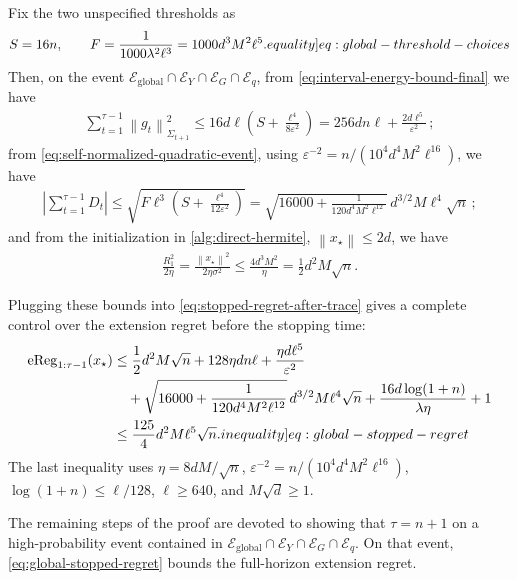 \documentclass[12pt,cleveref]{jmlr}
\newcommand{\eqlabel}[1]{\label[equality]{#1}}
\newcommand{\ineqlabel}[1]{\label[inequality]{#1}}
\newcommand{\1}{\mathbf 1}
\newcommand{\eps}{\varepsilon}
\newcommand{\norm}[1]{\left\lVert #1\right\rVert}
\newcommand{\normm}[2]{\left\lVert #1\right\rVert_{#2}}
\begin{document}
Fix the two unspecified thresholds as
\begin{align}
    S=16n,
    \qquad
    F=\frac{1}{1000\lambda^2\ell^3}
    =1000d^3M^2\ell^5.
    \eqlabel{eq:global-threshold-choices}
\end{align}
Then, on the event
$\mathcal E_{\mathrm{global}}\cap\mathcal E_Y\cap\mathcal E_G\cap\mathcal E_q$,
from \cref{eq:interval-energy-bound-final} we have
\begin{align}
    \sum_{t=1}^{\tau-1} \normm{g_t}{\Sigma_{t+1}}^2
    \leq
    16d\ell\left(S+\frac{\ell^4}{8\eps^2}\right)
    =256dn\ell+\frac{2d\ell^5}{\eps^2}\,;
\end{align}
from \cref{eq:self-normalized-quadratic-event}, using
$\eps^{-2}=n/(10^4d^4M^2\ell^{16})$, we have
\begin{align}
    \left|\sum_{t=1}^{\tau-1}D_t\right|
    \leq\sqrt{F\ell^3\left(S+\frac{\ell^4}{12\eps^2}\right)}
    =\sqrt{16000+\frac{1}{120d^4M^2\ell^{12}}}\,d^{3/2}M\ell^4\sqrt n\,;
\end{align}
and from the initialization in \cref{alg:direct-hermite},
$\norm{x_\star}\leq2d$, we have
\begin{align}
    \frac{R_1^2}{2\eta}
    =\frac{\norm{x_\star}^2}{2\eta\sigma^2}
    \leq\frac{4d^3M^2}{\eta}
    =\frac12d^2M\sqrt n.
\end{align}

Plugging these bounds into \cref{eq:stopped-regret-after-trace} gives a complete control over the extension regret before the stopping time:
\begin{align}
    \operatorname{eReg}_{1:\tau-1}(x_\star)
    & \leq \frac{1}{2} d^2 M \sqrt n
    + 128\eta d n \ell
    + \frac{\eta d\ell^5}{\eps^2}                                                 \\
    & \quad+ \sqrt{16000+\frac{1}{120d^4M^2\ell^{12}}}\,d^{3/2} M \ell^4 \sqrt n
    + \frac{16d\log(1+n)}{\lambda\eta}
    +1
    \\
    & \leq
    \frac{125}{4}d^2M\ell^5\sqrt n.
    \ineqlabel{eq:global-stopped-regret}
\end{align}
The last inequality uses $\eta=8dM/\sqrt n$,
$\eps^{-2}=n/(10^4d^4M^2\ell^{16})$,
$\log(1+n)\leq\ell/128$, $\ell\geq640$, and $M\sqrt d\geq1$.

The remaining steps of the proof are devoted to showing that $\tau=n+1$
on a high-probability event contained in
$\mathcal E_{\mathrm{global}}\cap\mathcal E_Y\cap\mathcal E_G\cap\mathcal E_q$.
On that event, \cref{eq:global-stopped-regret} bounds the full-horizon
extension regret.
\end{document}
